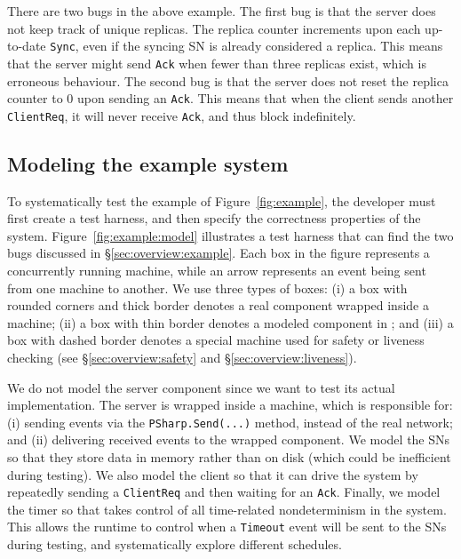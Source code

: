 There are two bugs in the above example. The first bug is that the server does not keep track of unique replicas. The replica counter increments upon each up-to-date \texttt{Sync}, even if the syncing SN is already considered a replica. This means that the server might send \texttt{Ack} when fewer than three replicas exist, which is erroneous behaviour. The second bug is that the server does not reset the replica counter to 0 upon sending an \texttt{Ack}. This means that when the client sends another \texttt{ClientReq}, it will never receive \texttt{Ack}, and thus block indefinitely.

\vspace{-1mm}
\subsection{Modeling the example system}
\label{sec:overview:model}

To systematically test the example of Figure~\ref{fig:example}, the developer must first create a \psharp test harness, and then specify the correctness properties of the system. Figure~\ref{fig:example:model} illustrates a test harness that can find the two bugs discussed in \S\ref{sec:overview:example}. Each box in the figure represents a concurrently running \psharp machine, while an arrow represents an event being sent from one machine to another. We use three types of boxes: (i) a box with rounded corners and thick border denotes a real component wrapped inside a \psharp machine; (ii) a box with thin border denotes a modeled component in \psharp; and (iii) a box with dashed border denotes a special \psharp machine used for safety or liveness checking (see \S\ref{sec:overview:safety} and \S\ref{sec:overview:liveness}).

We do not model the server component since we want to test its actual implementation. The server is wrapped inside a \psharp machine, which is responsible for: (i) sending events via the \texttt{PSharp.Send(...)} method, instead of the real network; and (ii) delivering received events to the wrapped component. We model the SNs so that they store data in memory rather than on disk (which could be inefficient during testing). We also model the client so that it can drive the system by repeatedly sending a \texttt{ClientReq} and then waiting for an \texttt{Ack}. Finally, we model the timer so that \psharp takes control of all time-related nondeterminism in the system. This allows the \psharp runtime to control when a \texttt{Timeout} event will be sent to the SNs during testing, and systematically explore different schedules.


